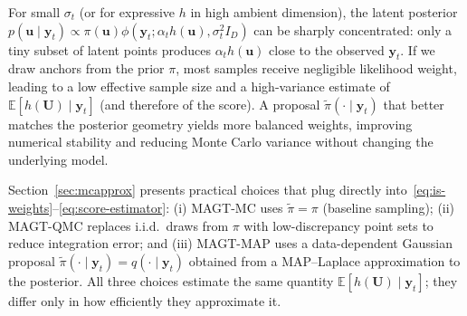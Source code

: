 \documentclass[12pt]{article}
\theoremstyle{definition} %
\newcommand{\U}{\bm U}
\newcommand{\y}{\bm y}
\begin{document}
For small $\sigma_t$ (or for expressive $h$ in high ambient dimension), the latent posterior
\(
p(\bm u\mid \y_t)\propto \pi(\bm u)\phi(\y_t;\alpha_t h(\bm u),\sigma_t^2 I_D)
\)
can be sharply concentrated: only a tiny subset of latent points produces $\alpha_t h(\bm u)$ close to the observed $\y_t$.
If we draw anchors from the prior $\pi$, most samples receive negligible likelihood weight, leading to a low effective sample size and
a high-variance estimate of $\mathbb E[h(\U)\mid \y_t]$ (and therefore of the score).
A proposal $\tilde\pi(\cdot\mid \y_t)$ that better matches the posterior geometry yields more balanced weights, improving numerical stability and
reducing Monte Carlo variance without changing the underlying model.

Section~\ref{sec:mcapprox} presents practical choices that plug directly into~\eqref{eq:is-weights}--\eqref{eq:score-estimator}:
(i) MAGT-MC uses $\tilde\pi=\pi$ (baseline sampling); (ii) MAGT-QMC replaces i.i.d.\ draws from $\pi$ with
low-discrepancy point sets to reduce integration error; and (iii) MAGT-MAP uses a data-dependent Gaussian proposal
$\tilde\pi(\cdot\mid \y_t)=q(\cdot\mid \y_t)$ obtained from a MAP--Laplace approximation to the posterior.
All three choices estimate the same quantity $\mathbb E[h(\bm U)\mid \y_t]$; they differ only in how efficiently they approximate it.
\end{document}
